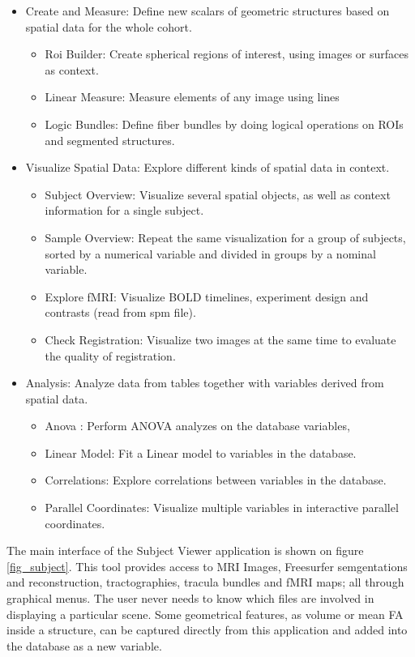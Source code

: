 \documentclass[utf8]{frontiersSCNS} %
\begin{document}
\begin{itemize}
\item Create and Measure: Define new scalars of geometric structures based on spatial data for the whole cohort.
\begin{itemize}
\item Roi Builder: Create spherical regions of interest, using images or surfaces as context.
\item Linear Measure: Measure elements of any image using lines
\item Logic Bundles: Define fiber bundles by doing logical operations on ROIs and segmented structures.
\end{itemize}
\item Visualize Spatial Data: Explore different kinds of spatial data in context.
\begin{itemize}
\item Subject Overview: Visualize several spatial objects, as well as context information for a single subject.
\item Sample Overview: Repeat the same visualization for a group of subjects, sorted by a numerical variable and divided in groups by a nominal variable.
\item Explore fMRI: Visualize BOLD timelines, experiment design and contrasts (read from spm file).
\item Check Registration: Visualize two images at the same time to evaluate the quality of registration. 
\end{itemize}
\item Analysis: Analyze data from tables together with variables derived from spatial data. 
\begin{itemize}
\item Anova : Perform ANOVA analyzes on the database variables,
\item Linear Model: Fit a Linear model to variables in the database.
\item Correlations: Explore correlations between variables in the database.
\item Parallel Coordinates: Visualize multiple variables in interactive parallel coordinates.
\end{itemize}
\end{itemize} 

The main interface of the Subject Viewer application is shown on figure \ref{fig_subject}. This tool provides access to MRI Images, Freesurfer semgentations and reconstruction, tractographies, tracula bundles and fMRI maps; all through graphical menus. The user never needs to know which files are involved in displaying a particular scene. Some geometrical features, as volume or mean FA inside a structure, can be captured directly from  this application and added into the database as a new variable. 
\end{document}
